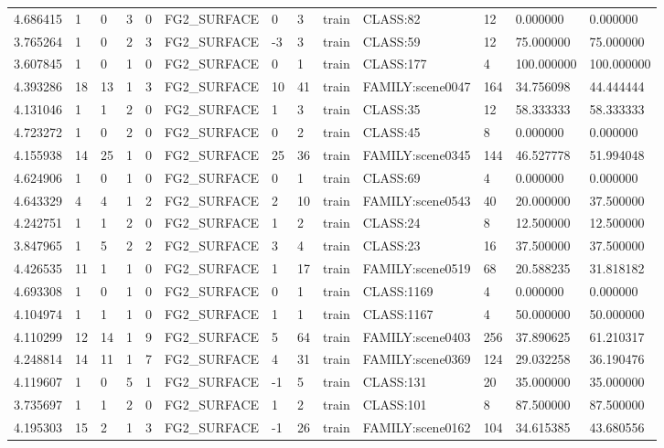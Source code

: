 \begin{tabular}{lllllllllllll}
4.686415 & 1 & 0 & 3 & 0 & FG2\_SURFACE & 0 & 3 & train & CLASS:82 & 12 & 0.000000 & 0.000000 \\
3.765264 & 1 & 0 & 2 & 3 & FG2\_SURFACE & -3 & 3 & train & CLASS:59 & 12 & 75.000000 & 75.000000 \\
3.607845 & 1 & 0 & 1 & 0 & FG2\_SURFACE & 0 & 1 & train & CLASS:177 & 4 & 100.000000 & 100.000000 \\
4.393286 & 18 & 13 & 1 & 3 & FG2\_SURFACE & 10 & 41 & train & FAMILY:scene0047 & 164 & 34.756098 & 44.444444 \\
4.131046 & 1 & 1 & 2 & 0 & FG2\_SURFACE & 1 & 3 & train & CLASS:35 & 12 & 58.333333 & 58.333333 \\
4.723272 & 1 & 0 & 2 & 0 & FG2\_SURFACE & 0 & 2 & train & CLASS:45 & 8 & 0.000000 & 0.000000 \\
4.155938 & 14 & 25 & 1 & 0 & FG2\_SURFACE & 25 & 36 & train & FAMILY:scene0345 & 144 & 46.527778 & 51.994048 \\
4.624906 & 1 & 0 & 1 & 0 & FG2\_SURFACE & 0 & 1 & train & CLASS:69 & 4 & 0.000000 & 0.000000 \\
4.643329 & 4 & 4 & 1 & 2 & FG2\_SURFACE & 2 & 10 & train & FAMILY:scene0543 & 40 & 20.000000 & 37.500000 \\
4.242751 & 1 & 1 & 2 & 0 & FG2\_SURFACE & 1 & 2 & train & CLASS:24 & 8 & 12.500000 & 12.500000 \\
3.847965 & 1 & 5 & 2 & 2 & FG2\_SURFACE & 3 & 4 & train & CLASS:23 & 16 & 37.500000 & 37.500000 \\
4.426535 & 11 & 1 & 1 & 0 & FG2\_SURFACE & 1 & 17 & train & FAMILY:scene0519 & 68 & 20.588235 & 31.818182 \\
4.693308 & 1 & 0 & 1 & 0 & FG2\_SURFACE & 0 & 1 & train & CLASS:1169 & 4 & 0.000000 & 0.000000 \\
4.104974 & 1 & 1 & 1 & 0 & FG2\_SURFACE & 1 & 1 & train & CLASS:1167 & 4 & 50.000000 & 50.000000 \\
4.110299 & 12 & 14 & 1 & 9 & FG2\_SURFACE & 5 & 64 & train & FAMILY:scene0403 & 256 & 37.890625 & 61.210317 \\
4.248814 & 14 & 11 & 1 & 7 & FG2\_SURFACE & 4 & 31 & train & FAMILY:scene0369 & 124 & 29.032258 & 36.190476 \\
4.119607 & 1 & 0 & 5 & 1 & FG2\_SURFACE & -1 & 5 & train & CLASS:131 & 20 & 35.000000 & 35.000000 \\
3.735697 & 1 & 1 & 2 & 0 & FG2\_SURFACE & 1 & 2 & train & CLASS:101 & 8 & 87.500000 & 87.500000 \\
4.195303 & 15 & 2 & 1 & 3 & FG2\_SURFACE & -1 & 26 & train & FAMILY:scene0162 & 104 & 34.615385 & 43.680556 \\

\end{tabular}
